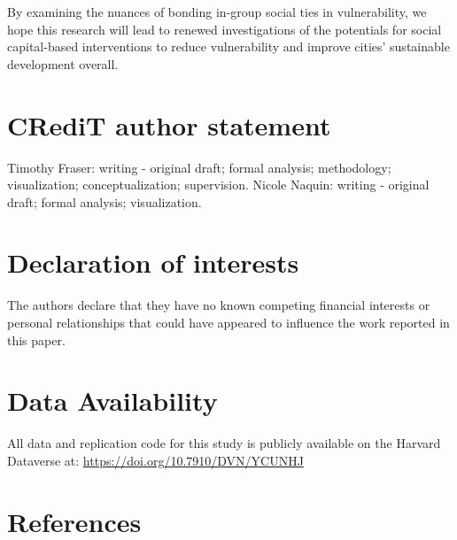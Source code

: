 \documentclass[]{elsarticle} %
\begin{document}
By examining the nuances of bonding in-group social ties in
vulnerability, we hope this research will lead to renewed investigations
of the potentials for social capital-based interventions to reduce
vulnerability and improve cities' sustainable development overall.

\hypertarget{credit-author-statement}{%
\section{CRediT author statement}\label{credit-author-statement}}

Timothy Fraser: writing - original draft; formal analysis; methodology;
visualization; conceptualization; supervision. Nicole Naquin: writing -
original draft; formal analysis; visualization.

\hypertarget{declaration-of-interests}{%
\section{Declaration of interests}\label{declaration-of-interests}}

The authors declare that they have no known competing financial
interests or personal relationships that could have appeared to
influence the work reported in this paper.

\hypertarget{data-availability}{%
\section{Data Availability}\label{data-availability}}

All data and replication code for this study is publicly available on
the Harvard Dataverse at: \url{https://doi.org/10.7910/DVN/YCUNHJ}

\singlespacing

\hypertarget{references}{%
\section*{References}\label{references}}
\end{document}
